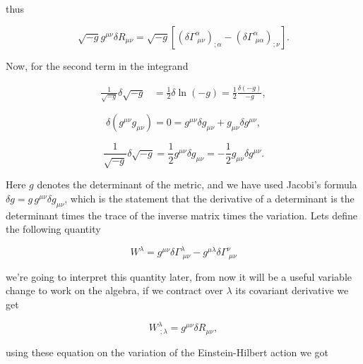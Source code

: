         thus

        \begin{equation}
            \sqrt{-g}g^{\mu\nu}\delta R_{\mu\nu} = \sqrt{-g}\left[(\delta\Gamma^{\alpha}_{\;\mu\nu})_{;\alpha} - (\delta\Gamma^{\alpha}_{\;\mu\alpha})_{;\nu} \right].
        \end{equation}

        Now, for the second term in the integrand

        \begin{align*}
            \frac{1}{\sqrt{-g}}\delta\sqrt{-g} &= \frac{1}{2}\delta \ln\left(-g \right) = \frac{1}{2}\frac{\delta\left(-g\right)}{-g},
        \end{align*}

        \begin{equation}
            \delta\left(g^{\mu\nu}g_{\mu\nu} \right) = 0 = g^{\mu\nu}\delta g_{\mu\nu} + g_{\mu\nu}\delta g^{\mu\nu},
        \end{equation}

        \begin{equation}
            \frac{1}{\sqrt{-g}}\delta \sqrt{-g} = \frac{1}{2}g^{\mu\nu}\delta g_{\mu\nu} = - \frac{1}{2}g_{\mu\nu}\delta g^{\mu\nu}.
        \end{equation}

        Here $g$ denotes the determinant of the metric, and we have used Jacobi's formula $\delta g = g\,g^{\mu\nu}\delta g_{\mu\nu}$, which is the statement that the derivative of a determinant is the determinant times the trace of the inverse matrix times the variation. Lets define the following quantity 

        \begin{equation}\label{eq:Wlambda}
            W^{\lambda} = g^{\mu\nu}\delta\Gamma^{\lambda}_{\;\mu\nu}-g^{\mu \lambda}\delta\Gamma^{\nu}_{\;\mu\nu}
        \end{equation}

        we're going to interpret this quantity later, from now it will be a useful variable change  to work on the algebra, if we contract over $\lambda$ its covariant derivative we get

        \begin{equation}
            W^{\lambda}_{\;;\lambda} = g^{\mu\nu}\delta R_{\mu\nu},
        \end{equation}

        using these equation on the variation of the Einstein-Hilbert action we got

